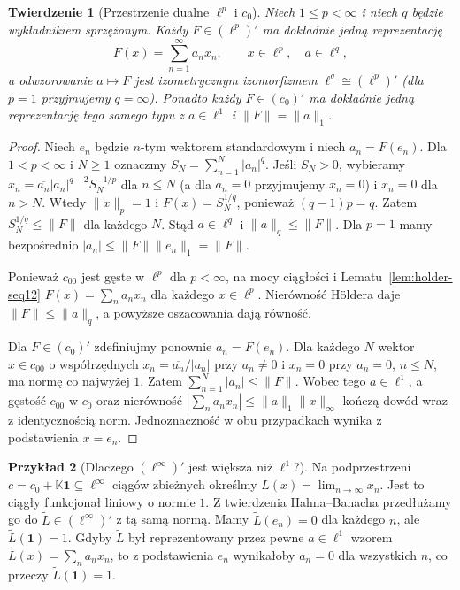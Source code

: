 \documentclass[11pt,a4paper]{article}
\numberwithin{equation}{section}
\theoremstyle{plain}
\newtheorem{twierdzenie}{Twierdzenie}[section]
\theoremstyle{definition}
\newtheorem{przyklad}[twierdzenie]{Przykład}
\theoremstyle{remark}
\newcommand{\K}{\mathbb K}
\begin{document}
\begin{twierdzenie}[Przestrzenie dualne $\ell^p$ i $c_0$]
\label{thm:dual-sequences12}
Niech $1\le p<\infty$ i niech $q$ będzie wykładnikiem sprzężonym.
Każdy $F\in(\ell^p)'$ ma dokładnie jedną reprezentację
\[
 F(x)=\sum_{n=1}^\infty a_nx_n,\qquad x\in\ell^p,
 \quad a\in\ell^q,
\]
a odwzorowanie $a\mapsto F$ jest izometrycznym izomorfizmem
$\ell^q\cong(\ell^p)'$ (dla $p=1$ przyjmujemy $q=\infty$).
Ponadto każdy $F\in(c_0)'$ ma dokładnie jedną reprezentację
tego samego typu z $a\in\ell^1$ i $\|F\|=\|a\|_1$.
\end{twierdzenie}
\begin{proof}
Niech $e_n$ będzie $n$-tym wektorem standardowym i niech
$a_n=F(e_n)$. Dla $1<p<\infty$ i $N\ge1$ oznaczmy
$S_N=\sum_{n=1}^N|a_n|^q$. Jeśli $S_N>0$, wybieramy
$x_n=\overline{a_n}|a_n|^{q-2}S_N^{-1/p}$
dla $n\le N$ (a dla $a_n=0$ przyjmujemy $x_n=0$)
i $x_n=0$ dla $n>N$. Wtedy
$\|x\|_p=1$ i $F(x)=S_N^{1/q}$, ponieważ
$(q-1)p=q$. Zatem $S_N^{1/q}\le\|F\|$ dla każdego $N$.
Stąd $a\in\ell^q$ i $\|a\|_q\le\|F\|$.
Dla $p=1$ mamy bezpośrednio
$|a_n|\le\|F\|\|e_n\|_1=\|F\|$.

Ponieważ $c_{00}$ jest gęste w $\ell^p$ dla $p<\infty$,
na mocy ciągłości i Lematu~\ref{lem:holder-seq12}
$F(x)=\sum_na_nx_n$ dla każdego $x\in\ell^p$.
Nierówność H\"oldera daje $\|F\|\le\|a\|_q$,
a powyższe oszacowania dają równość.

Dla $F\in(c_0)'$ zdefiniujmy ponownie $a_n=F(e_n)$.
Dla każdego $N$ wektor $x\in c_{00}$ o współrzędnych
$x_n=\overline{a_n}/|a_n|$ przy $a_n\ne0$ i
$x_n=0$ przy $a_n=0$, $n\le N$, ma normę co najwyżej $1$.
Zatem $\sum_{n=1}^N|a_n|\le\|F\|$.
Wobec tego $a\in\ell^1$, a gęstość $c_{00}$ w $c_0$
oraz nierówność $|\sum_na_nx_n|\le\|a\|_1\|x\|_\infty$
kończą dowód wraz z identycznością norm.
Jednoznaczność w obu przypadkach wynika z podstawienia $x=e_n$.
\end{proof}

\begin{przyklad}[Dlaczego $(\ell^\infty)'$ jest większa niż $\ell^1$?]
\label{ex:linfty-dual-seq12}
Na podprzestrzeni $c=c_0+\K\mathbf1\subseteq\ell^\infty$
ciągów zbieżnych określmy $L(x)=\lim_{n\to\infty}x_n$.
Jest to ciągły funkcjonał liniowy o normie $1$.
Z twierdzenia Hahna--Banacha przedłużamy go do
$\widetilde L\in(\ell^\infty)'$ z tą samą normą.
Mamy $\widetilde L(e_n)=0$ dla każdego $n$, ale
$\widetilde L(\mathbf1)=1$. Gdyby $\widetilde L$
był reprezentowany przez pewne $a\in\ell^1$ wzorem
$\widetilde L(x)=\sum_na_nx_n$, to z podstawienia $e_n$
wynikałoby $a_n=0$ dla wszystkich $n$, co przeczy
$\widetilde L(\mathbf1)=1$.
\end{przyklad}
\end{document}
